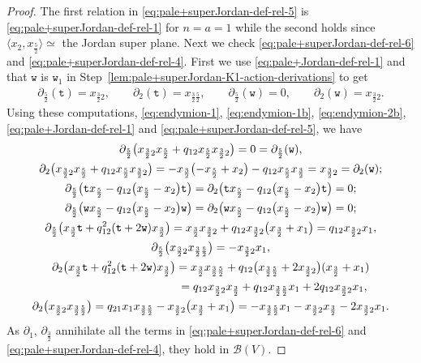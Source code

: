 \documentclass[10pt,a4paper]{amsart}
\numberwithin{equation}{section}
\newcommand{\toba}{\mathscr B}
\newcommand{\ttt}{\mathtt{t}}
\newcommand{\wt}{\mathtt{w}}
\newcommand{\tresdos}{\frac{3}{2}}
\newcommand{\cincodos}{\frac{5}{2}}
\begin{document}
\begin{proof}
The first relation in \eqref{eq:pale+superJordan-def-rel-5} is \eqref{eq:pale+superJordan-def-rel-1} for $n=a=1$ while the second holds since
$\big\langle x_{2}, x_{\cincodos}\big\rangle \simeq $ the Jordan super plane.
Next we check \eqref{eq:pale+superJordan-def-rel-6} and \eqref{eq:pale+superJordan-def-rel-4}.
First we use \eqref{eq:pale+Jordan-def-rel-1} and that $\wt$ is $\wt_1$ in Step~\ref{lem:pale+superJordan-K1-action-derivations} to get
\begin{gather*}
\partial_{\cincodos}(\ttt)=x_{\tresdos2},\qquad
\partial_{2}(\ttt)=x_{\tresdos\cincodos},\qquad
\partial_{\cincodos}(\wt)=0,\qquad
\partial_{2}(\wt)=x_{\tresdos2}.
\end{gather*}
Using these computations, \eqref{eq:endymion-1}, \eqref{eq:endymion-1b}, \eqref{eq:endymion-2b}, \eqref{eq:pale+Jordan-def-rel-1} and \eqref{eq:pale+superJordan-def-rel-5}, we have
\begin{gather*}
\partial_{\cincodos} \big(x_{\tresdos2}x_{\cincodos} +q_{12}x_{\cincodos}x_{\tresdos2}\big) = 0 = \partial_{\cincodos}(\wt),
\\
\partial_{2} \big(x_{\tresdos2}x_{\cincodos} +q_{12}x_{\cincodos}x_{\tresdos2}\big) = -x_{\tresdos}\bigl(-x_{\cincodos}+x_2\bigr) -q_{12}x_{\cincodos}x_{\tresdos}=x_{\tresdos2}=\partial_{2}(\wt);
\\
\partial_{\cincodos} \big(\ttt x_{\cincodos} -q_{12}\big(x_{\cincodos}-x_{2}\big)\ttt\big) =
\partial_{2} \big(\ttt x_{\cincodos} -q_{12}\big(x_{\cincodos}-x_{2}\big)\ttt\big) = 0;
\\
\partial_{\cincodos} \big(\wt x_{\cincodos}-q_{12}\big(x_{\cincodos}-x_{2}\big)\wt\big) =
\partial_{2} \big(\wt x_{\cincodos}-q_{12}\big(x_{\cincodos}-x_{2}\big)\wt\big) =0;
\\
\partial_{\cincodos} \big(x_{\tresdos}\ttt +q_{12}^2(\ttt+2\wt)x_{\tresdos}\big) = x_{\tresdos}x_{\tresdos2} +q_{12}x_{\tresdos2}\big(x_{\tresdos}+x_1\big)
= q_{12}x_{\tresdos2}x_1,
\\
\partial_{\cincodos} \big(x_{\tresdos2}x_{\tresdos\cincodos}\big) = -x_{\tresdos2}x_1,
\\
\partial_{2} \big(x_{\tresdos}\ttt +q_{12}^2(\ttt+2\wt)x_{\tresdos}\big) = x_{\tresdos}x_{\tresdos\cincodos} +q_{12}\big(x_{\tresdos\cincodos}+2x_{\tresdos2}\big)(x_{\tresdos}+x_1)
\\ \hphantom{\partial_{2} \big(x_{\tresdos}\ttt +q_{12}^2(\ttt+2\wt)x_{\tresdos}\big)}
{}= q_{12}x_{\tresdos2}x_{\tresdos}+q_{12}x_{\tresdos\cincodos}x_1+2q_{12}x_{\tresdos2}x_1,
\\
\partial_{2} \big(x_{\tresdos2}x_{\tresdos\cincodos}\big) = q_{21}x_1x_{\tresdos\cincodos}-x_{\tresdos2}\big(x_{\tresdos}+x_1\big)
=-x_{\tresdos\cincodos}x_1 -x_{\tresdos2}x_{\tresdos}-2x_{\tresdos2}x_1.
\end{gather*}
As $\partial_1$, $\partial_{\tresdos}$ annihilate all the terms in \eqref{eq:pale+superJordan-def-rel-6} and \eqref{eq:pale+superJordan-def-rel-4}, they hold in $\toba(V)$.


\end{proof}
\end{document}
